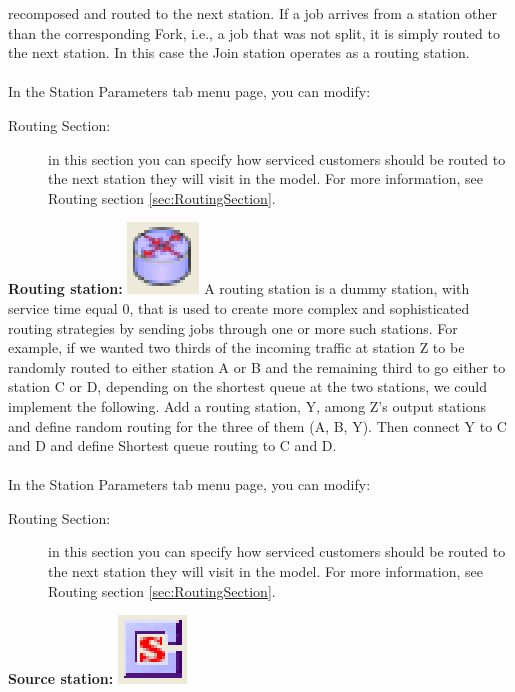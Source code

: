\begin{enumerate*}
recomposed and routed to the next station. If a job arrives from a station other than the corresponding Fork, i.e., a job that was not split, it is simply routed to the next station. In this case the Join station operates as a routing station.\\\\
In the Station Parameters tab menu page, you can modify:
\begin{description}
\item[Routing Section:] in this section you can specify how serviced customers should be routed to the next station they will visit in the model.
For more information, see Routing section \ref{sec:RoutingSection}.
\end{description}
\item \textbf{Routing station:} \includegraphics[scale=1]{img/jsim/load_splitter.eps}
A routing station is a dummy station, with service time equal 0, that is used to create more complex and sophisticated routing strategies by sending jobs through one or more such stations. For example, if we wanted two thirds of the incoming traffic at station Z to be randomly routed to either station A or B and the remaining third to go either to station C or D, depending on the shortest queue at the two stations, we could implement the following. Add a routing station, Y, among Z's output stations and define random routing for the three of them (A, B, Y). Then connect Y to C and D and define Shortest queue routing to C and D.\\\\
In the Station Parameters tab menu page, you can modify:
\begin{description}
\item[Routing Section:] in this section you can specify how serviced customers should be routed to the next station they will visit in the model.
For more information, see Routing section \ref{sec:RoutingSection}.
\end{description}
\item \textbf{Source station:} \includegraphics[scale=1]{img/jsim/source.eps}

\end{enumerate*}
